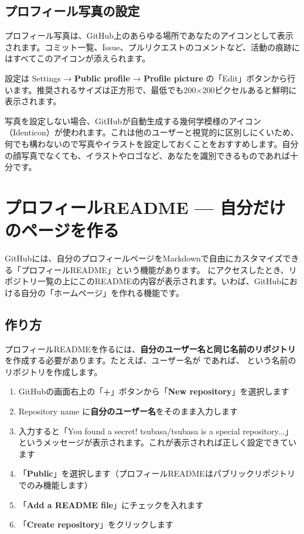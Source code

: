 \subsection{プロフィール写真の設定}

プロフィール写真は、GitHub上のあらゆる場所であなたのアイコンとして表示されます。コミット一覧、Issue、プルリクエストのコメントなど、活動の痕跡にはすべてこのアイコンが添えられます。

設定は Settings → \textbf{Public profile} → \textbf{Profile picture} の「Edit」ボタンから行います。推奨されるサイズは正方形で、最低でも200×200ピクセルあると鮮明に表示されます。

写真を設定しない場合、GitHubが自動生成する幾何学模様のアイコン（Identicon）が使われます。これは他のユーザーと視覚的に区別しにくいため、何でも構わないので写真やイラストを設定しておくことをおすすめします。自分の顔写真でなくても、イラストやロゴなど、あなたを識別できるものであれば十分です。

\section{プロフィールREADME — 自分だけのページを作る}

GitHubには、自分のプロフィールページをMarkdownで自由にカスタマイズできる「プロフィールREADME」という機能があります。 にアクセスしたとき、リポジトリ一覧の上にこのREADMEの内容が表示されます。いわば、GitHubにおける自分の「ホームページ」を作れる機能です。

\subsection{作り方}

プロフィールREADMEを作るには、\textbf{自分のユーザー名と同じ名前のリポジトリ}を作成する必要があります。たとえば、ユーザー名が  であれば、 という名前のリポジトリを作成します。

\begin{enumerate}
  \item GitHubの画面右上の「\textbf{+}」ボタンから「\textbf{New repository}」を選択します
  \item Repository name に\textbf{自分のユーザー名}をそのまま入力します
  \item 入力すると「You found a secret! tsubasa/tsubasa is a special repository...」というメッセージが表示されます。これが表示されれば正しく設定できています
  \item 「\textbf{Public}」を選択します（プロフィールREADMEはパブリックリポジトリでのみ機能します）
  \item 「\textbf{Add a README file}」にチェックを入れます
  \item 「\textbf{Create repository}」をクリックします
\end{enumerate}

